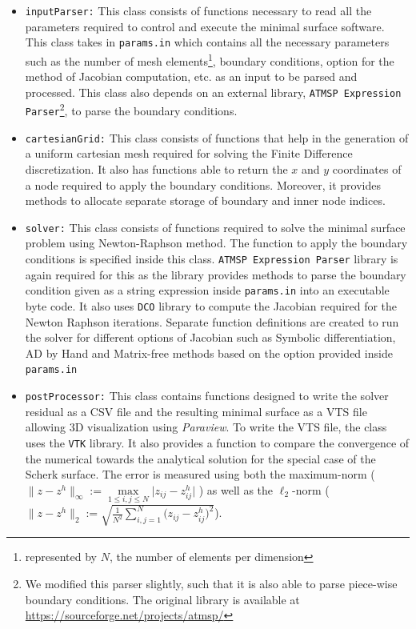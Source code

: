 \documentclass[11pt]{scrartcl}
\begin{document}
\begin{itemize}
	\item {\texttt{inputParser:} This class consists of functions necessary to read all the parameters required to control and execute the minimal surface software. This class takes in \texttt{params.in} which contains all the necessary parameters such as the number of mesh elements\footnote{represented by $N$, the number of elements per dimension}, boundary conditions, option for the method of Jacobian computation, etc. as an input to be parsed and processed. This class also depends on an external library, \texttt{ATMSP Expression Parser}\footnote{We modified this parser slightly, such that it is also able to parse piece-wise boundary conditions. The original library is available at \url{https://sourceforge.net/projects/atmsp/}}, to parse the boundary conditions.}
	\item {\texttt{cartesianGrid:} This class consists of functions that help in the generation of a uniform cartesian mesh required for solving the Finite Difference discretization. It also has functions able to return the $x$ and $y$ coordinates of a node required to apply the boundary conditions. Moreover, it provides methods to allocate separate storage of boundary and inner node indices.}
	\item {\texttt{solver:} This class consists of functions required to solve the minimal surface problem using Newton-Raphson method. The function to apply the boundary conditions is specified inside this class. \texttt{ATMSP Expression Parser} library is again required for this as the library provides methods to parse the boundary condition given as a string expression inside \texttt{params.in} into an executable byte code. It also uses \texttt{DCO} library to compute the Jacobian required for the  Newton Raphson iterations. Separate function definitions are created to run the solver for different options of Jacobian such as Symbolic differentiation, AD by Hand and Matrix-free methods based on the option provided inside \texttt{params.in}}
	\item  {\texttt{postProcessor:} This class contains functions designed to write the solver residual as a CSV file and the resulting minimal surface as a VTS file allowing 3D visualization using \textit{Paraview}. To write the VTS file, the class uses the \texttt{VTK} library. It also provides a function to compare the convergence of the numerical towards the analytical solution for the special case of the Scherk surface. The error is measured using both the  maximum-norm ($\lVert z-z^h \rVert_\infty := \max\limits_{1\le i,j\le N} \lvert z_{ij}-z^h_{ij}\rvert$ ) as well as the  $\ell_2$-norm ($\lVert z-z^h \rVert_2 := \sqrt{ \frac{1}{N^2} \sum_{i,j=1}^{N} \big(z_{ij}-z_{ij}^h\big)^2}$).}
\end{itemize}
\end{document}
